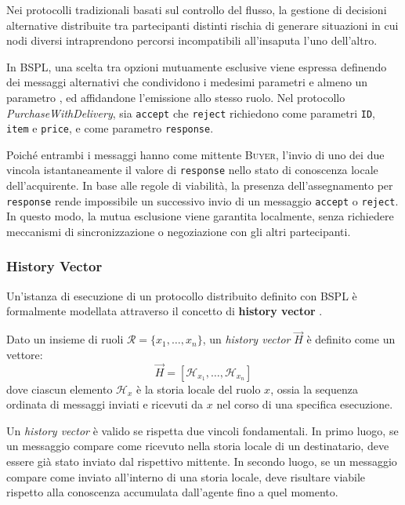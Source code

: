 Nei protocolli tradizionali basati sul controllo del flusso, la gestione di decisioni alternative distribuite tra 
partecipanti distinti rischia di generare situazioni in cui nodi diversi 
intraprendono percorsi incompatibili all'insaputa l'uno dell'altro.

In BSPL, una scelta tra opzioni mutuamente esclusive viene espressa definendo dei messaggi alternativi 
che condividono i medesimi parametri  e almeno un parametro , ed affidandone l'emissione allo stesso ruolo.
Nel protocollo \emph{PurchaseWithDelivery}, sia \texttt{accept} che \texttt{reject} richiedono come parametri  
\texttt{ID}, \texttt{item} e \texttt{price}, e come parametro  \texttt{response}.

Poiché entrambi i messaggi hanno come mittente \textsc{Buyer}, l'invio di uno dei due vincola istantaneamente il 
valore di \texttt{response} nello stato di conoscenza locale dell'acquirente. 
In base alle regole di viabilità, la presenza dell'assegnamento per \texttt{response} rende impossibile
un successivo invio di un messaggio \texttt{accept} o \texttt{reject}.
In questo modo, la mutua esclusione viene garantita localmente, senza richiedere
meccanismi di sincronizzazione o negoziazione con gli altri partecipanti.

\subsubsection{History Vector}\label{bspl:history-vector}

Un'istanza di esecuzione di un protocollo distribuito definito con BSPL è formalmente 
modellata attraverso il concetto di \textbf{history vector} \autocite{singh2011lost}.

Dato un insieme di ruoli $\mathcal{R} = \{x_1, \dots, x_n\}$, un \emph{history vector} $\vec{H}$ è 
definito come un vettore:
\begin{equation}
    \vec{H} = [\mathcal{H}_{x_1}, \dots, \mathcal{H}_{x_n}]
\end{equation}
dove ciascun elemento $\mathcal{H}_{x}$ è la storia locale del ruolo $x$, ossia la sequenza ordinata di messaggi inviati e ricevuti da $x$ nel corso di una specifica esecuzione.

Un \emph{history vector} è valido se rispetta due vincoli fondamentali.
In primo luogo, se un messaggio compare come ricevuto nella storia locale
di un destinatario, deve essere già stato inviato dal rispettivo mittente.
In secondo luogo, se un messaggio compare come inviato all'interno di una 
storia locale, deve risultare viabile rispetto alla conoscenza accumulata
dall'agente fino a quel momento.

